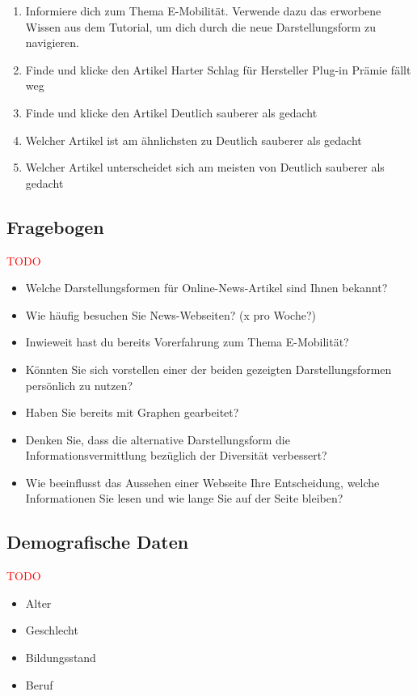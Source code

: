 \begin{enumerate}
    \item Informiere dich zum Thema E-Mobilität. Verwende dazu das erworbene Wissen aus dem Tutorial, um dich durch die neue Darstellungsform zu navigieren.
    \item Finde und klicke den Artikel \glqq Harter Schlag für Hersteller Plug-in Prämie fällt weg\grqq{}
    \item Finde und klicke den Artikel \glqq Deutlich sauberer als gedacht\grqq{}
    \item Welcher Artikel ist am ähnlichsten zu \glqq Deutlich sauberer als gedacht\grqq{}
    \item Welcher Artikel unterscheidet sich am meisten von \glqq Deutlich sauberer als gedacht\grqq{}
\end{enumerate}

\subsection{Fragebogen}
\textcolor{red}{TODO}

\begin{itemize}
    \item Welche Darstellungsformen für Online-News-Artikel sind Ihnen bekannt?
    \item Wie häufig besuchen Sie News-Webseiten? (x pro Woche?)
    \item Inwieweit hast du bereits Vorerfahrung zum Thema E-Mobilität?
    \item Könnten Sie sich vorstellen einer der beiden gezeigten Darstellungsformen persönlich zu nutzen?
    \item Haben Sie bereits mit Graphen gearbeitet?
    \item Denken Sie, dass die alternative Darstellungsform die Informationsvermittlung bezüglich der Diversität verbessert?
    \item Wie beeinflusst das Aussehen einer Webseite Ihre Entscheidung, welche Informationen Sie lesen und wie lange Sie auf der Seite bleiben?
\end{itemize}

\subsection{Demografische Daten}
\textcolor{red}{TODO}
\begin{itemize}
    \item Alter
    \item Geschlecht
    \item Bildungsstand
    \item Beruf
\end{itemize}